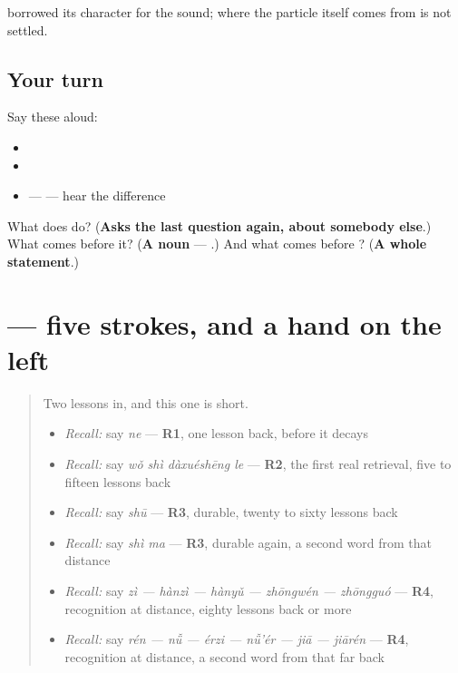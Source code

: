 \begin{cousinweb}
\textbf{} borrowed its character for the sound; where the particle itself comes from is not settled.
\end{cousinweb}

\subsection*{Your turn}
Say these aloud:

\begin{itemize}
\raggedright
  \item {}
  \item {}
  \item {} —  — hear the difference
\end{itemize}

\begin{tcolorbox}[breakable,colback=teal!4,colframe=teal!35!black,title={Before you move on}]
What does  do? (\textbf{Asks the last question again, about somebody else}.) What comes before it? (\textbf{A noun} — .) And what comes before ? (\textbf{A whole statement}.)
\end{tcolorbox}
\section[\texorpdfstring{\zh{对} (duì)}{对 (duì)}]{ — five strokes, and a hand on the left}

\label{lesson:ZH-W26-dui}



\begin{quote}
Two lessons in, and this one is short.

\begin{itemize}
\raggedright
  \item \emph{Recall:} say \emph{ne} — \textbf{R1}, one lesson back, before it decays
  \item \emph{Recall:} say \emph{wǒ shì dàxuéshēng le} — \textbf{R2}, the first real retrieval, five to fifteen lessons back
  \item \emph{Recall:} say \emph{shū} — \textbf{R3}, durable, twenty to sixty lessons back
  \item \emph{Recall:} say \emph{shì ma} — \textbf{R3}, durable again, a second word from that distance
  \item \emph{Recall:} say \emph{zì — hànzì — hànyǔ — zhōngwén — zhōngguó} — \textbf{R4}, recognition at distance, eighty lessons back or more
  \item \emph{Recall:} say \emph{rén — nǚ — érzi — nǚ'ér — jiā — jiārén} — \textbf{R4}, recognition at distance, a second word from that far back
\end{itemize}
\end{quote}

